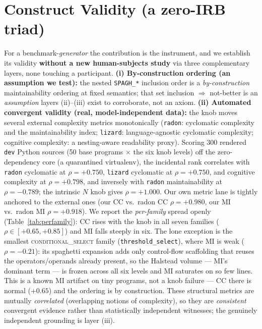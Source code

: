 \documentclass[11pt]{article}
\begin{document}
\section{Construct Validity (a zero-IRB triad)}\label{sec:cv}
For a benchmark-\emph{generator} the contribution is the instrument, and we establish
its validity \textbf{without a new human-subjects study} via three complementary layers,
none touching a participant. \textbf{(i) By-construction ordering (an assumption we test):}
the nested \texttt{SPAGH\_*} inclusion order is a \emph{by-construction} maintainability
ordering at fixed semantics; that set inclusion $\Rightarrow$ not-better is an
\emph{assumption} layers (ii)--(iii) exist to corroborate, not an axiom. \textbf{(ii)
Automated convergent validity (real, model-independent data):}
the knob moves several external complexity metrics monotonically
(\texttt{radon}: cyclomatic complexity and the maintainability index; \texttt{lizard}:
language-agnostic cyclomatic complexity; cognitive complexity: a nesting-aware readability
proxy). Scoring 300 rendered \texttt{dev} Python sources (50 base programs $\times$ the
six knob levels) off the zero-dependency core (a quarantined virtualenv), the incidental
rank correlates with \texttt{radon} cyclomatic at $\rho=+0.750$, \texttt{lizard}
cyclomatic at $\rho=+0.750$, and cognitive complexity at $\rho=+0.798$, and inversely
with \texttt{radon} maintainability at $\rho=-0.789$; the intrinsic $N$ knob gives
$\rho=+1.000$. Our own metric lane is tightly anchored to the external ones (our CC vs.\
radon CC $\rho=+0.980$, our MI vs.\ radon MI $\rho=+0.918$). We report the
\emph{per-family} spread openly (Table~\ref{tab:perfamily}): CC rises with the knob in all
seven families ($\rho\in[{+}0.65,{+}0.85]$) and MI falls steeply in six. The lone exception
is the smallest \textsc{conditional\_select} family (\texttt{threshold\_select}), where MI
is weak ($\rho=-0.21$): its spaghetti expansion adds only control-flow scaffolding that
reuses the operators/operands already present, so the Halstead volume --- MI's dominant
term --- is frozen across all six levels and MI saturates on so few lines. This is a known
MI artifact on tiny programs, not a knob failure --- CC there is normal ($+0.65$) and the
ordering is by construction. These structural metrics are mutually \emph{correlated} (overlapping
notions of complexity), so they are \emph{consistent} convergent evidence rather than
statistically independent witnesses; the genuinely independent grounding is layer (iii).
\end{document}
